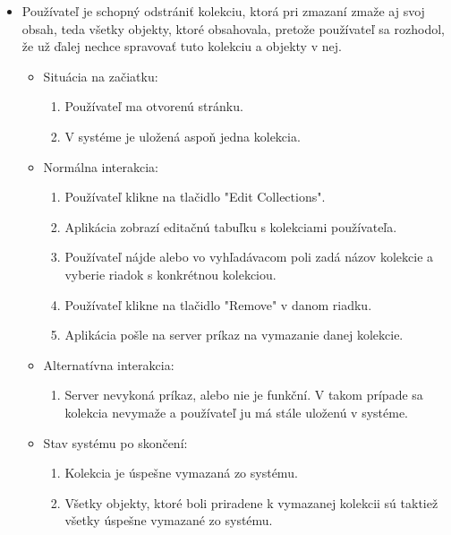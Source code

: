 \begin{itemize}
      \item Používateľ je schopný odstrániť kolekciu, ktorá pri zmazaní zmaže aj svoj obsah, teda všetky objekty, ktoré obsahovala, pretože používateľ sa rozhodol, že už ďalej nechce spravovať tuto kolekciu a objekty v nej.
            \begin{itemize}
                  \item Situácia na začiatku:
                        \begin{enumerate}
                              \item Používateľ ma otvorenú stránku.
                              \item V systéme je uložená aspoň jedna kolekcia.
                        \end{enumerate}
                  \item Normálna interakcia:
                        \begin{enumerate}
                              \item Používateľ klikne na tlačidlo "Edit Collections".
                              \item Aplikácia zobrazí editačnú tabuľku s kolekciami používateľa.
                              \item Používateľ nájde alebo vo vyhľadávacom poli zadá názov kolekcie a vyberie riadok s konkrétnou kolekciou.
                              \item Používateľ klikne na tlačidlo "Remove" v danom riadku.
                              \item Aplikácia pošle na server príkaz na vymazanie danej kolekcie.
                        \end{enumerate}
                  \item Alternatívna interakcia:
                        \begin{enumerate}
                              \item Server nevykoná príkaz, alebo nie je funkční. V takom prípade sa kolekcia nevymaže a používateľ ju má stále uloženú v systéme.
                        \end{enumerate}
                  \item Stav systému po skončení:
                        \begin{enumerate}
                              \item Kolekcia je úspešne vymazaná zo systému.
                              \item Všetky objekty, ktoré boli priradene k vymazanej kolekcii sú taktiež všetky úspešne vymazané zo systému.
                        \end{enumerate}
            \end{itemize}


\end{itemize}
